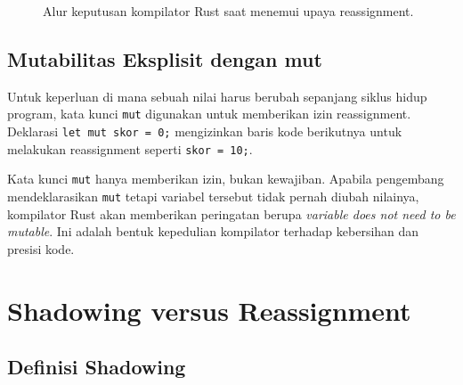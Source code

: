 \documentclass[11pt,a4paper]{article}
\begin{document}
\begin{figure}[H]
	\centering
	\caption{Alur keputusan kompilator Rust saat menemui upaya reassignment.}
	\label{fig:immutable-flow}
\end{figure}

\subsection{Mutabilitas Eksplisit dengan mut}

Untuk keperluan di mana sebuah nilai harus berubah sepanjang siklus hidup program, kata kunci \texttt{mut} digunakan untuk memberikan izin reassignment. Deklarasi \texttt{let mut skor = 0;} mengizinkan baris kode berikutnya untuk melakukan reassignment seperti \texttt{skor = 10;}.

Kata kunci \texttt{mut} hanya memberikan izin, bukan kewajiban. Apabila pengembang mendeklarasikan \texttt{mut} tetapi variabel tersebut tidak pernah diubah nilainya, kompilator Rust akan memberikan peringatan berupa \textit{variable does not need to be mutable}. Ini adalah bentuk kepedulian kompilator terhadap kebersihan dan presisi kode.

\section{Shadowing versus Reassignment}

\subsection{Definisi Shadowing}
\end{document}
